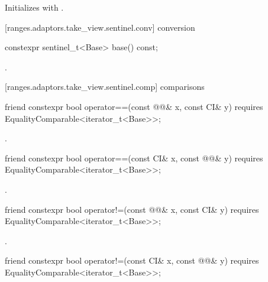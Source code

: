 \begin{itemdescr}
\pnum
\effects Initializes  with .
\end{itemdescr}

[ranges.adaptors.take_view.sentinel.conv]{ conversion}

\begin{itemdecl}
constexpr sentinel_t<Base> base() const;
\end{itemdecl}

\begin{itemdescr}
\pnum
\returns {}.
\end{itemdescr}

[ranges.adaptors.take_view.sentinel.comp]{ comparisons}

\begin{itemdecl}
friend constexpr bool operator==(const @@& x, const CI& y)
requires EqualityComparable<iterator_t<Base>>;
\end{itemdecl}

\begin{itemdescr}
\pnum
\returns {}.
\end{itemdescr}

\begin{itemdecl}
friend constexpr bool operator==(const CI& x, const @@& y)
requires EqualityComparable<iterator_t<Base>>;
\end{itemdecl}

\begin{itemdescr}
\pnum
\returns {}.
\end{itemdescr}

%
\begin{itemdecl}
friend constexpr bool operator!=(const @@& x, const CI& y)
requires EqualityComparable<iterator_t<Base>>;
\end{itemdecl}

\begin{itemdescr}
\pnum
\returns {}.
\end{itemdescr}

\begin{itemdecl}
friend constexpr bool operator!=(const CI& x, const @@& y)
requires EqualityComparable<iterator_t<Base>>;
\end{itemdecl}

